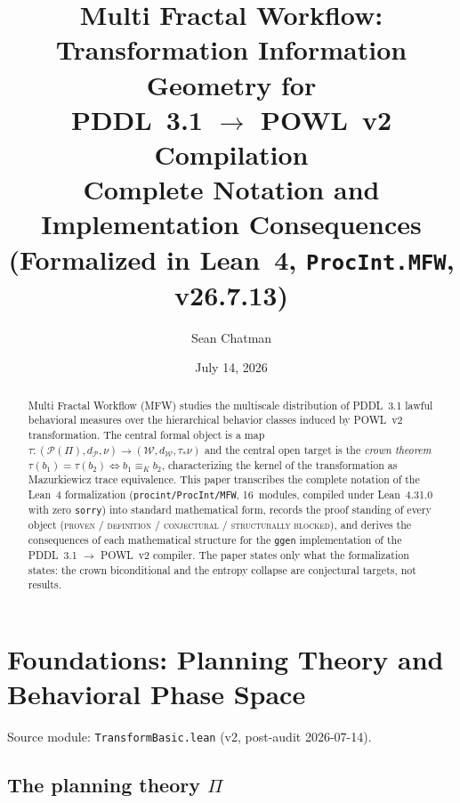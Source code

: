 \documentclass[11pt]{article}
\title{Multi Fractal Workflow:\\
Transformation Information Geometry for\\
PDDL~3.1 $\to$ POWL~v2 Compilation\\[0.6em]
\large Complete Notation and Implementation Consequences\\
(Formalized in Lean~4, \texttt{ProcInt.MFW}, v26.7.13)}
\author{Sean Chatman}
\date{July 14, 2026}
\newcommand{\PT}{\Pi}                          %
\newcommand{\PS}{\mathcal{P}(\PT)}             %
\newcommand{\WS}{\mathcal{W}}                  %
\newcommand{\tmap}{\tau}                       %
\newcommand{\kerEq}{\equiv_{K}}                %
\newcommand{\dW}{d_{\mathcal{W}}}
\newcommand{\dP}{d_{\mathcal{P}}}
\theoremstyle{plain}
\theoremstyle{definition}
\begin{document}
\maketitle

\begin{abstract}
Multi Fractal Workflow (MFW) studies the multiscale distribution of PDDL~3.1
lawful behavioral measures over the hierarchical behavior classes induced by
POWL~v2 transformation. The central formal object is a map
$\tmap : (\PS, \dP, \nu) \to (\WS, \dW, \tmap_{*}\nu)$ and the central open
target is the \emph{crown theorem}
$\tmap(b_1) = \tmap(b_2) \iff b_1 \kerEq b_2$, characterizing the kernel of
the transformation as Mazurkiewicz trace equivalence. This paper transcribes
the complete notation of the Lean~4 formalization
(\texttt{procint/ProcInt/MFW}, 16~modules, compiled under Lean~4.31.0 with
zero \texttt{sorry}) into standard mathematical form, records the proof
standing of every object (\textsc{proven} / \textsc{definition} /
\textsc{conjectural} / \textsc{structurally blocked}), and derives the
consequences of each mathematical structure for the \texttt{ggen}
implementation of the PDDL~3.1 $\to$ POWL~v2 compiler. The paper states only
what the formalization states: the crown biconditional and the entropy
collapse are conjectural targets, not results.
\end{abstract}

\tableofcontents

\section{Foundations: Planning Theory and Behavioral Phase Space}
\label{sec:foundations}
Source module: \texttt{TransformBasic.lean} (v2, post-audit 2026-07-14).

\subsection{The planning theory $\PT$}
\end{document}
